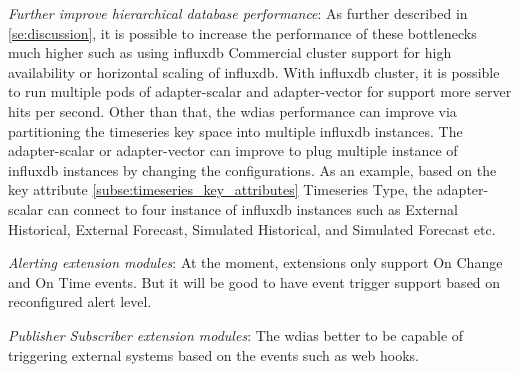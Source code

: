 \emph{Further improve hierarchical database performance}:
As further described in \ref{se:discussion}, it is possible to increase the performance of these bottlenecks much higher such as using \acrshort{influxdb} Commercial cluster support for high availability or horizontal scaling of \acrshort{influxdb}. With \acrshort{influxdb} cluster, it is possible to run multiple pods of adapter-scalar and adapter-vector for support more server hits per second.
Other than that, the \acrshort{wdias} performance can improve via partitioning the timeseries key space into multiple \acrshort{influxdb} instances. The adapter-scalar or adapter-vector can improve to plug multiple instance of \acrshort{influxdb} instances by changing the configurations. As an example, based on the key attribute \ref{subse:timeseries_key_attributes} Timeseries Type, the adapter-scalar can connect to four instance of \acrshort{influxdb} instances such as  External Historical, External Forecast, Simulated Historical, and Simulated Forecast etc.

\emph{Alerting extension modules}:
At the moment, extensions only support On Change and On Time events. But it will be good to have event trigger support based on reconfigured alert level.

\emph{Publisher Subscriber extension modules}:
The \acrshort{wdias} better to be capable of triggering external systems based on the events such as web hooks.


